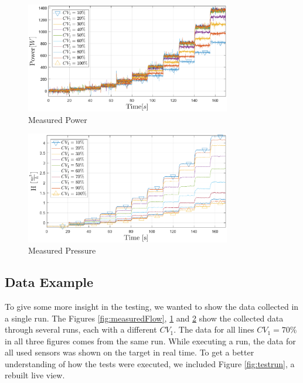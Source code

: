 \begin{figure}[H]
	\centering
	\includegraphics[width=0.8\textwidth]{figures/05mathematicalModelling/measuredPower.eps}
	\caption{Measured Power}
	\label{fig:measuredPower}
\end{figure}

\begin{figure}[H]
	\centering
	\includegraphics[width=0.8\textwidth]{figures/05mathematicalModelling/measuredPressure.eps}
	\caption{Measured Pressure}
	\label{fig:measuredPressure}
\end{figure}


\subsection{Data Example}%
To give some more insight in the testing,
we wanted to show the data collected in a single run.
The Figures \ref{fig:measuredFlow}, \ref{fig:measuredPower} and \ref{fig:measuredPressure}
show the collected data through several runs,
each with a different $CV_1$.
The data for all lines $CV_1 = 70\%$ in all three figures comes from the same run.
While executing a run,
the data for all used sensors was shown on the target in real time.
To get a better understanding of how the tests were executed,
we included Figure \ref{fig:testrun},
a rebuilt live view.

